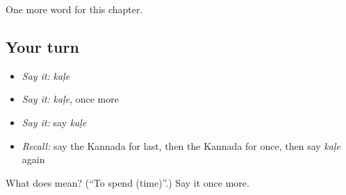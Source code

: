 \begin{grammarlens}[title={What you've built}]
One more word for this chapter.
\end{grammarlens}

\subsection*{Your turn}
\begin{itemize}
\raggedright
  \item \emph{Say it:} \emph{kaḷe}
  \item \emph{Say it:} \emph{kaḷe}, once more
  \item \emph{Say it:} say \emph{kaḷe}
  \item \emph{Recall:} say the Kannada for last, then the Kannada for once, then say \emph{kaḷe} again
\end{itemize}

\begin{tcolorbox}[breakable,colback=teal!4,colframe=teal!35!black,title={Before you move on}]
What does  mean? (\textquotedblleft{}To spend (time)\textquotedblright{}.) Say it once more.
\end{tcolorbox}

